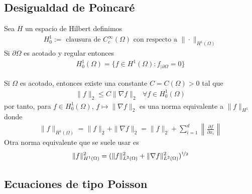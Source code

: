 \documentclass[12pt]{book}
\begin{document}
    \subsection{Desigualdad de Poincaré}
    \begin{definicion}
        Sea $H$ un espacio de Hilbert definimos
        \begin{gather*}
            H_0^1 := \text{ clausura de } C_c^\infty(\Omega) \text{ con respecto a } \|\cdot\|_{H^1(\Omega)}
        \end{gather*}
        Si $\partial \Omega$ es acotado y regular entonces
        \begin{gather*}
            H_0^1(\Omega) = \{f\in H^1 (\Omega) : f_{|\partial \Omega} = 0\}
        \end{gather*}
    \end{definicion}

    \begin{lema}
        Si $\Omega$ es acotado, entonces existe una constante $C = C(\Omega) > 0$ tal que 
        \begin{gather*}
            \|f\|_2 \leq C \|\nabla f\|_2 \ \ \ \forall f \in H_0^1(\Omega)
        \end{gather*}
        por tanto, para $f\in H_0^1(\Omega)$, $f\mapsto \|\nabla f\|_2$ es una norma equivalente a $\|f\|_{H^1}$ donde 
        \begin{gather*}
            \|f\|_{H^1(\Omega)} = \|f\|_2 + \|\nabla f\|_2 = \|f\|_2 + \sum_{i=1}^d \left\| \frac{\partial f}{\partial x_i} \right\|
        \end{gather*}
        Otra norma equivalente que se suele usar es
        \begin{gather*}
            \|f\|_{H^1(\Omega)}^2 = (\|f\|^2_{L^2(\Omega)} + \|\nabla f \|^2_{L^2(\Omega)})^{\nicefrac{1}{2}}
        \end{gather*}
    \end{lema}

    \subsection{Ecuaciones de tipo Poisson}

\end{document}
